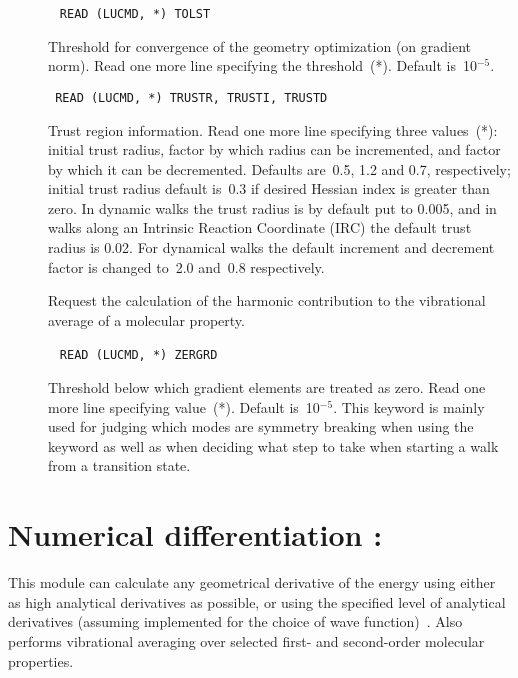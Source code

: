 \begin{description}
\item[]\verb| |\newline
\verb|READ (LUCMD, *) TOLST|

Threshold for convergence of the geometry optimization (on gradient
norm).  Read one more line specifying the threshold~(*).  Default
is~10$^{-5}$.

\item[]\verb| |\newline
\verb|READ (LUCMD, *) TRUSTR, TRUSTI, TRUSTD|

Trust region information.  Read one more
line specifying three values~(*): initial trust radius, factor by
which radius can be incremented, and factor by which it can be
decremented.  Defaults are~0.5, 1.2 and 0.7, respectively; initial
trust radius default is~0.3 if desired Hessian index is
greater than zero. In dynamic walks the trust radius
is by default put
to 0.005, and in walks along an Intrinsic Reaction Coordinate
(IRC) the
default trust radius is 0.02. For dynamical walks the default
increment and decrement factor is changed to~2.0 and~0.8
respectively.

\item[]
Request the calculation of the harmonic contribution to the
vibrational average of a molecular property.


\item[]\verb| |\newline
\verb|READ (LUCMD, *) ZERGRD|

Threshold below which gradient elements are
treated as zero.  Read one more line specifying value~(*). Default
is~10$^{-5}$. This keyword is mainly used for judging which modes are
symmetry breaking when using the keyword  as well as
when deciding what step to take when starting a walk from a transition
state.
\end{description}

\section{Numerical differentiation : }\label{sec:nmddrv}

This module can calculate any geometrical derivative of the energy
using either as high analytical derivatives as possible, or using the
specified level of analytical derivatives (assuming implemented for
the choice of wave function)~\cite{numder}. Also performs vibrational averaging over
selected first- and second-order molecular properties.

